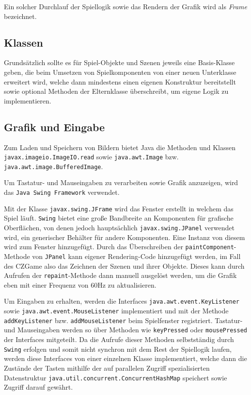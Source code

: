 Ein solcher Durchlauf der Spiellogik sowie das Rendern der Grafik
wird als \textit{Frame} bezeichnet.


\subsection{Klassen}

Grundsätzlich sollte es für Spiel-Objekte und Szenen jeweils eine
Basis-Klasse geben, die beim Umsetzen von Spielkomponenten von einer
neuen Unterklasse erweitert wird, welche dann mindestens einen eigenen
Konstruktur bereitstellt sowie optional Methoden der Elternklasse
überschreibt, um eigene Logik zu implementieren.


\subsection{Grafik und Eingabe} \label{idee:engine:grafik-eingabe}

\begin{sloppypar}

Zum Laden und Speichern von Bildern bietet Java die Methoden
und Klassen \texttt{javax.imageio.ImageIO.read} sowie
\texttt{java.awt.Image} bzw. \texttt{java.awt.image.BufferedImage}.

Um Tastatur- und Mauseingaben zu verarbeiten sowie Grafik
anzuzeigen, wird das \texttt{Java Swing Framework} verwendet.

Mit der Klasse \texttt{javax.swing.JFrame} wird das Fenster
erstellt in welchem das Spiel läuft. \texttt{Swing} bietet eine große
Bandbreite an Komponenten für grafische Oberflächen, von denen
jedoch hauptsächlich \texttt{javax.swing.JPanel} verwendet wird,
ein generischer Behälter für andere Komponenten. Eine Instanz von
diesem wird zum Fenster hinzugefügt. Durch das Überschreiben der
\texttt{paintComponent}-Methode von \texttt{JPanel} kann eigener
Rendering-Code hinzugefügt werden, im Fall des CZGame also
das Zeichnen der Szenen und ihrer Objekte. Dieses kann durch
Aufrufen der \texttt{repaint}-Methode dann manuell ausgelöst werden,
um die Grafik eben mit einer Frequenz von 60Hz zu aktualisieren.

Um Eingaben zu erhalten, werden die Interfaces \texttt{java.awt.event.KeyListener}
sowie \texttt{java.awt.event.MouseListener} implementiert und mit
der Methode \texttt{addKeyListener} bzw. \texttt{addMouseListener}
beim Spielfenster registriert. Tastatur- und Mauseingaben werden
so über Methoden wie \texttt{keyPressed} oder \texttt{mousePressed}
der Interfaces mitgeteilt. Da die Aufrufe dieser Methoden selbstständig
durch \texttt{Swing} erfolgen und somit nicht synchron mit dem
Rest der Spiellogik laufen, werden diese Interfaces von einer einzelnen
Klasse implementiert, welche dann die Zustände der Tasten mithilfe der
auf parallelen Zugriff spezialisierten Datenstruktur
\texttt{java.util.concurrent.ConcurrentHashMap} speichert sowie
Zugriff darauf gewährt.
\end{sloppypar}


